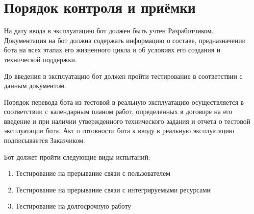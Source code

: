 \section{Порядок контроля и приёмки}
\label{sec:test}
На дату ввода в эксплуатацию бот должен быть учтен Разработчиком.
Документация на бот должна содержать информацию о составе,
предназначении бота на всех этапах его жизненного цикла и
об условиях его создания и технической поддержки.

До введения в эксплуатацию бот должен пройти тестирование в соответствии с данным документом.

Порядок перевода бота из тестовой в реальную эксплуатацию осуществляется в соответствии
с календарным планом работ, определенных в договоре на его введение и при наличии
утвержденного технического задания и отчета о тестовой эксплуатации бота.
Акт о готовности бота к вводу в реальную эксплуатацию подписывается Заказчиком.

Бот должет пройти следующие виды испытаний:
\begin{enumerate}
    \item
        Тестирование на прерывание связи с пользователем
    \item
        Тестирование на прерывание связи с интегрируемыми ресурсами
    \item
        Тестирование на долгосрочную работу
\end{enumerate}
